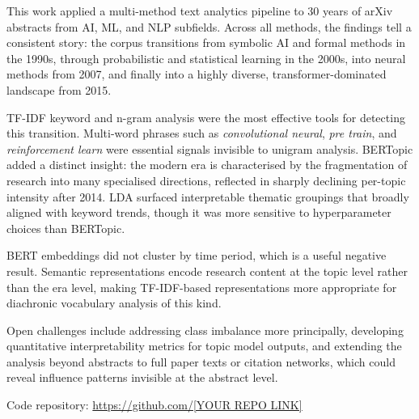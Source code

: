 \documentclass{article}
\begin{document}
This work applied a multi-method text analytics pipeline to
30 years of arXiv abstracts from AI, ML, and NLP subfields.
Across all methods, the findings tell a consistent story:
the corpus transitions from symbolic AI and formal methods
in the 1990s, through probabilistic and statistical learning
in the 2000s, into neural methods from 2007, and finally
into a highly diverse, transformer-dominated landscape from
2015.

TF-IDF keyword and n-gram analysis were the most effective
tools for detecting this transition. Multi-word phrases
such as \textit{convolutional neural}, \textit{pre train},
and \textit{reinforcement learn} were essential signals
invisible to unigram analysis. BERTopic added a distinct
insight: the modern era is characterised by the
fragmentation of research into many specialised directions,
reflected in sharply declining per-topic intensity after
2014. LDA surfaced interpretable thematic groupings that
broadly aligned with keyword trends, though it was more
sensitive to hyperparameter choices than BERTopic.

BERT embeddings did not cluster by time period, which is a
useful negative result. Semantic representations encode
research content at the topic level rather than the era
level, making TF-IDF-based representations more appropriate
for diachronic vocabulary analysis of this kind.

Open challenges include addressing class imbalance more
principally, developing quantitative interpretability
metrics for topic model outputs, and extending the analysis
beyond abstracts to full paper texts or citation networks,
which could reveal influence patterns invisible at the
abstract level.

Code repository: \url{https://github.com/[YOUR REPO LINK]}




\end{document}
